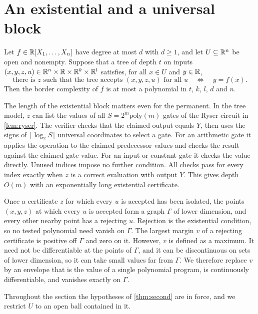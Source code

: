 \section{An existential and a universal block}\label{sec:second}

\begin{theorem}\label{thm:second}
Let $f\in\mathbb{R}[X_1,\dots,X_n]$ have degree at most $d$ with $d\ge1$, and let $U\subseteq\mathbb{R}^n$ be open and nonempty. Suppose that a tree of depth $t$ on inputs $(x,y,z,u)\in\mathbb{R}^n\times\mathbb{R}\times\mathbb{R}^k\times\mathbb{R}^l$ satisfies, for all $x\in U$ and $y\in\mathbb{R}$,
\[
\text{there is }z\text{ such that the tree accepts }(x,y,z,u)\text{ for all }u\quad\Longleftrightarrow\quad y=f(x).
\]
Then the border complexity of $f$ is at most a polynomial in $t$, $k$, $l$, $d$ and $n$.
\end{theorem}

The length of the existential block matters even for the permanent. In the tree model, $z$ can list the values of all $S=2^m\mathrm{poly}(m)$ gates of the Ryser circuit in \cref{lem:ryser}. The verifier checks that the claimed output equals $Y$, then uses the signs of $\lceil\log_2 S\rceil$ universal coordinates to select a gate. For an arithmetic gate it applies the operation to the claimed predecessor values and checks the result against the claimed gate value. For an input or constant gate it checks the value directly. Unused indices impose no further condition. All checks pass for every index exactly when $z$ is a correct evaluation with output $Y$. This gives depth $O(m)$ with an exponentially long existential certificate.

Once a certificate $z$ for which every $u$ is accepted has been isolated, the points $(x,y,z)$ at which every $u$ is accepted form a graph $\Gamma$ of lower dimension, and every other nearby point has a rejecting $u$. Rejection is the existential condition, so no tested polynomial need vanish on $\Gamma$. The largest margin $v$ of a rejecting certificate is positive off $\Gamma$ and zero on it. However, $v$ is defined as a maximum. It need not be differentiable at the points of $\Gamma$, and it can be discontinuous on sets of lower dimension, so it can take small values far from $\Gamma$. We therefore replace $v$ by an envelope that is the value of a single polynomial program, is continuously differentiable, and vanishes exactly on $\Gamma$.

Throughout the section the hypotheses of \cref{thm:second} are in force, and we restrict $U$ to an open ball contained in it.

